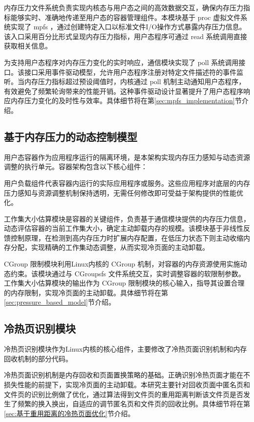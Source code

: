 内存压力文件系统负责实现内核态与用户态之间的高效数据交互，确保内存压力指标能够实时、准确地传递至用户态的容器管理组件。本模块基于 proc 虚拟文件系统实现了 mpfs ，通过创建特定入口以标准文件I/O操作方式暴露内存压力信息。该入口采用百分比形式呈现内存压力指标，用户态程序可通过 read 系统调用直接获取相关信息。

为支持用户态程序对内存压力变化的实时响应，通信模块实现了 poll 系统调用接口。该接口采用事件驱动模型，允许用户态程序注册对特定文件描述符的事件监听。当内存压力指标超过预设阈值时，内核通过 poll 机制主动通知用户态程序，有效避免了频繁轮询带来的性能开销。这种事件驱动设计显著提升了用户态程序响应内存压力变化的及时性与效率。具体细节将在第\ref{sec:mpfs_implementation}节介绍。


\subsection{基于内存压力的动态控制模型}

用户态容器作为应用程序运行的隔离环境，是本架构实现内存压力感知与动态资源调整的执行单元。容器架构包含以下核心组件：

用户负载组件代表容器内运行的实际应用程序或服务。这些应用程序对底层的内存压力感知与资源调整机制保持透明，无需任何修改即可受益于架构提供的性能优化。

工作集大小估算模块是容器的关键组件，负责基于通信模块提供的内存压力信息，动态评估容器的当前工作集大小，确定主动卸载内存的规模。该模块基于非线性反馈控制原理，在检测到高内存压力时扩展内存配置，在低压力状态下则主动收缩内存分配，实现精确的工作集动态调整，从而实现冷页面的主动卸载。

 CGroup 限制模块利用Linux内核的 CGroup 机制，对容器的内存资源使用实施动态约束。该模块通过与 CGroupsfs 文件系统交互，实时调整容器的软限制参数。工作集大小估算模块的输出作为 CGroup 限制模块的核心输入，指导其设置合理的内存限制，实现冷页面的主动卸载。具体细节将在第\ref{sec:pressure_based_model}节介绍。

\subsection{冷热页识别模块}

冷热页识别模块作为Linux内核的核心组件，主要修改了冷热页面识别机制和内存回收机制的部分代码。

冷热页面识别机制是内存回收和页面置换策略的基础。正确识别冷热页面才能在不损失性能的前提下，实现冷页面的主动卸载。本研究主要针对回收页面中匿名页和文件页的识别比例做了优化，通过算法得到文件页的重用距离判断该文件页是否发生了频繁的换入换出，自适应的调节匿名页和文件页的回收比例。具体细节将在第\ref{sec:基于重用距离的冷热页面优化}节介绍。

